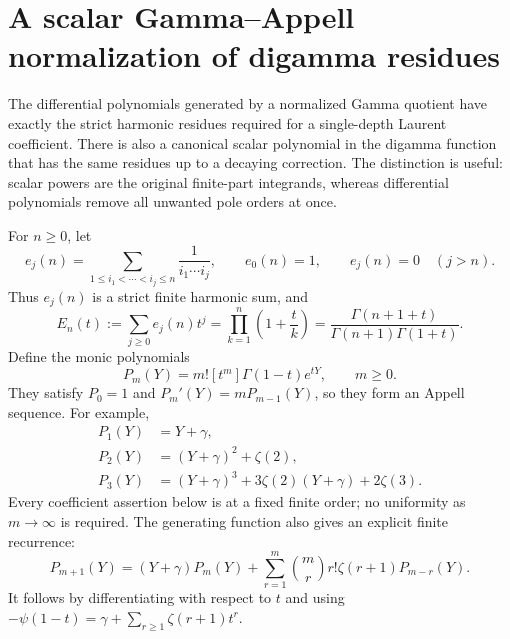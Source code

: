 \documentclass[11pt,a4paper]{article}
\numberwithin{equation}{section}
\theoremstyle{definition}
\begin{document}

\section{A scalar Gamma--Appell normalization of digamma residues}
\label{sec:scalar-gamma-normalizer}

The differential polynomials generated by a normalized Gamma quotient
have exactly the strict harmonic residues required for a single-depth
Laurent coefficient.  There is also a canonical scalar polynomial in
the digamma function that has the same residues up to a decaying
correction.  The distinction is useful: scalar powers are the original
finite-part integrands, whereas differential polynomials remove all
unwanted pole orders at once.

For $n\geq0$, let
\begin{equation}
 e_j(n)=\sum_{1\leq i_1<\cdots<i_j\leq n}
             \frac{1}{i_1\cdots i_j},
 \qquad e_0(n)=1,
 \qquad e_j(n)=0\quad(j>n).
 \label{eq:scalar-elementary-definition}
\end{equation}
Thus $e_j(n)$ is a strict finite harmonic sum, and
\begin{equation}
 E_n(t):=\sum_{j\geq0}e_j(n)t^j
   =\prod_{k=1}^{n}\left(1+\frac{t}{k}\right)
   =\frac{\Gamma(n+1+t)}{\Gamma(n+1)\Gamma(1+t)}.
 \label{eq:scalar-elementary-generator}
\end{equation}
Define the monic polynomials
\begin{equation}
 P_m(Y)=m![t^m]\Gamma(1-t)e^{tY},\qquad m\geq0.
 \label{eq:scalar-appell-definition}
\end{equation}
They satisfy $P_0=1$ and $P_m'(Y)=mP_{m-1}(Y)$, so they form an
Appell sequence.  For example,
\begin{equation}
 \begin{aligned}
 P_1(Y)&=Y+\gamma,\\
 P_2(Y)&=(Y+\gamma)^2+\zeta(2),\\
 P_3(Y)&=(Y+\gamma)^3+3\zeta(2)(Y+\gamma)+2\zeta(3).
 \end{aligned}
 \label{eq:scalar-first-polynomials}
\end{equation}
Every coefficient assertion below is at a fixed finite order; no
uniformity as $m\to\infty$ is required.
The generating function also gives an explicit finite recurrence:
\begin{equation}\label{eq:scalar-recurrence}
 P_{m+1}(Y)=(Y+\gamma)P_m(Y)
  +\sum_{r=1}^m\binom mr r!\zeta(r+1)P_{m-r}(Y).
\end{equation}
It follows by differentiating with respect to $t$ and using
$-\psi(1-t)=\gamma+\sum_{r\ge1}\zeta(r+1)t^r$.
\end{document}

